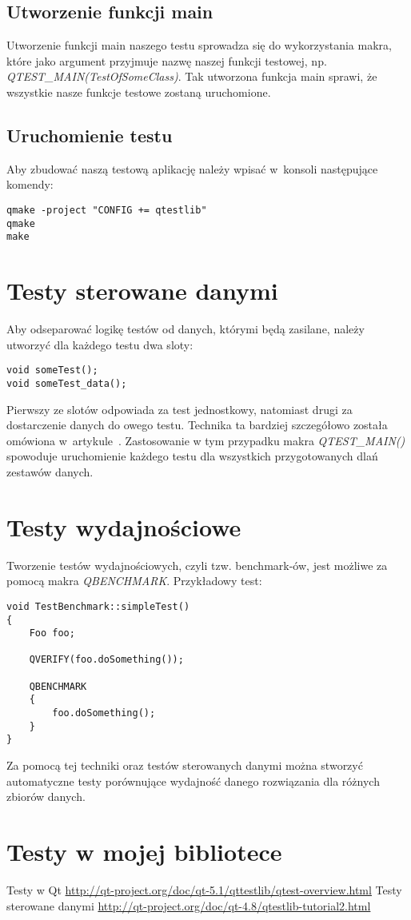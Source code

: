 \documentclass[11pt,twoside,a4paper,final]{article}
\begin{document}
\subsection{Utworzenie funkcji main}
Utworzenie funkcji main naszego testu sprowadza się do wykorzystania makra, które jako argument przyjmuje nazwę naszej funkcji testowej, np.\newline 
\textit{QTEST\_MAIN(TestOfSomeClass)}. Tak utworzona funkcja main sprawi, że wszystkie nasze funkcje testowe zostaną uruchomione.

\subsection{Uruchomienie testu}
Aby zbudować naszą testową aplikację należy wpisać w~konsoli następujące komendy:
\begin{lstlisting}
qmake -project "CONFIG += qtestlib"
qmake
make
\end{lstlisting}

\section{Testy sterowane danymi}
Aby odseparować logikę testów od danych, którymi będą zasilane, należy utworzyć dla każdego testu dwa sloty:
\begin{lstlisting}
void someTest();
void someTest_data();
\end{lstlisting}
Pierwszy ze slotów odpowiada za test jednostkowy, natomiast drugi za dostarczenie danych do owego testu. Technika ta bardziej szczegółowo została omówiona w~artykule~\cite{datadriven}.
Zastosowanie w tym przypadku makra \textit{QTEST\_MAIN()} spowoduje uruchomienie każdego testu dla wszystkich przygotowanych dlań zestawów danych.

\section{Testy wydajnościowe}
Tworzenie testów wydajnościowych, czyli tzw. benchmark-ów, jest możliwe za pomocą makra \textit{QBENCHMARK}. Przykładowy test:
\begin{lstlisting}
void TestBenchmark::simpleTest()
{
	Foo foo;

	QVERIFY(foo.doSomething());

	QBENCHMARK 
	{
		foo.doSomething();
	}
}
\end{lstlisting}

Za pomocą tej techniki oraz testów sterowanych danymi można stworzyć automatyczne testy porównujące wydajność danego rozwiązania dla różnych zbiorów danych.

\section{Testy w mojej bibliotece}

\begin{thebibliography}{}

Testy w Qt \url{http://qt-project.org/doc/qt-5.1/qttestlib/qtest-overview.html}
Testy sterowane danymi \url{http://qt-project.org/doc/qt-4.8/qtestlib-tutorial2.html}


\end{thebibliography}
\end{document}
